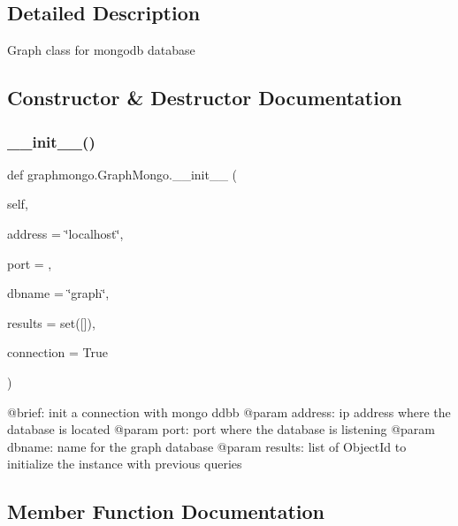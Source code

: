 \subsection{Detailed Description}
\begin{DoxyVerb}Graph class for mongodb database
\end{DoxyVerb}
 

\subsection{Constructor \& Destructor Documentation}
\hypertarget{classgraphmongo_1_1GraphMongo_aab68747470d18460a87e296ff6e2a651}{}\label{classgraphmongo_1_1GraphMongo_aab68747470d18460a87e296ff6e2a651} 
\subsubsection{\texorpdfstring{\+\_\+\+\_\+init\+\_\+\+\_\+()}{\_\_init\_\_()}}
{\footnotesize\ttfamily def graphmongo.\+Graph\+Mongo.\+\_\+\+\_\+init\+\_\+\+\_\+ (\begin{DoxyParamCaption}\item[{}]{self,  }\item[{}]{address = {\ttfamily \char`\"{}localhost\char`\"{}},  }\item[{}]{port = {},  }\item[{}]{dbname = {\ttfamily \char`\"{}graph\char`\"{}},  }\item[{}]{results = {\ttfamily set(\mbox{[}\mbox{]})},  }\item[{}]{connection = {\ttfamily True} }\end{DoxyParamCaption})}

\begin{DoxyVerb}    @brief: init a connection with mongo ddbb
    @param address: ip address where the database is located 
    @param port: port where the database is listening
@param dbname: name for the graph database
@param results: list of ObjectId to initialize the instance with previous queries 
\end{DoxyVerb}
 

\subsection{Member Function Documentation}
\hypertarget{classgraphmongo_1_1GraphMongo_add06fd535fdfe5dce31d0da7c06676fc}{}\label{classgraphmongo_1_1GraphMongo_add06fd535fdfe5dce31d0da7c06676fc} 
